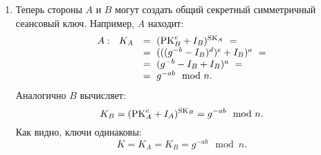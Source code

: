 \begin{enumerate}
    \item Теперь стороны $A$ и $B$ могут создать общий секретный симметричный сеансовый ключ. Например, $A$ находит:
        \[ \begin{array}{ll}
            A: ~~ K_A & = ~ (\textrm{PK}_B^e + I_B)^{\textrm{SK}_A} ~ = \\
                & = ~ (((g^{-b} - I_B)^d)^e + I_B)^a ~ = \\
                & = ~ (g^{-b} - I_B + I_B)^a ~ = \\
                & = ~ g^{-ab} \mod n. \\
        \end{array} \]
        Аналогично $B$ вычисляет:
            \[ K_B = (\textrm{PK}_A^e + I_A)^{\textrm{SK}_B} = g^{-ab} \mod n. \]
        Как видно, ключи одинаковы:
            \[ K = K_A = K_B = g^{-ab} \mod n. \]
\end{enumerate}
